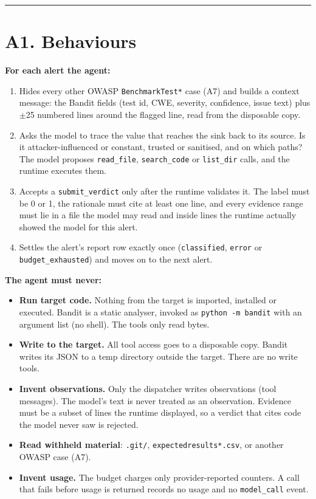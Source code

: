 \documentclass[
  10pt,
]{article}
\providecommand{\tightlist}{%
  \setlength{\itemsep}{0pt}\setlength{\parskip}{0pt}}
\begin{document}
\begin{center}\rule{0.5\linewidth}{0.5pt}\end{center}

\section{A1. Behaviours}\label{a1.-behaviours}

\textbf{For each alert the agent:}

\begin{enumerate}
\def\labelenumi{\arabic{enumi}.}
\tightlist
\item
  Hides every other OWASP \texttt{BenchmarkTest*} case (A7) and builds a
  context message: the Bandit fields (test id, CWE, severity,
  confidence, issue text) plus \ensuremath{\pm}25 numbered lines around the flagged
  line, read from the disposable copy.
\item
  Asks the model to trace the value that reaches the sink back to its
  source. Is it attacker-influenced or constant, trusted or sanitised,
  and on which paths? The model proposes \texttt{read\_file},
  \texttt{search\_code} or \texttt{list\_dir} calls, and the runtime
  executes them.
\item
  Accepts a \texttt{submit\_verdict} only after the runtime validates
  it. The label must be 0 or 1, the rationale must cite at least one
  line, and every evidence range must lie in a file the model may read
  and inside lines the runtime actually showed the model for this alert.
\item
  Settles the alert's report row exactly once (\texttt{classified},
  \texttt{error} or \texttt{budget\_exhausted}) and moves on to the next
  alert.
\end{enumerate}

\textbf{The agent must never:}

\begin{itemize}
\tightlist
\item
  \textbf{Run target code.} Nothing from the target is imported,
  installed or executed. Bandit is a static analyser, invoked as
  \texttt{python\ -m\ bandit} with an argument list (no shell). The
  tools only read bytes.
\item
  \textbf{Write to the target.} All tool access goes to a disposable
  copy. Bandit writes its JSON to a temp directory outside the target.
  There are no write tools.
\item
  \textbf{Invent observations.} Only the dispatcher writes observations
  (tool messages). The model's text is never treated as an observation.
  Evidence must be a subset of lines the runtime displayed, so a verdict
  that cites code the model never saw is rejected.
\item
  \textbf{Read withheld material}: \texttt{.git/},
  \texttt{expectedresults*.csv}, or another OWASP case (A7).
\item
  \textbf{Invent usage.} The budget charges only provider-reported
  counters. A call that fails before usage is returned records no usage
  and no \texttt{model\_call} event.
\end{itemize}
\end{document}
